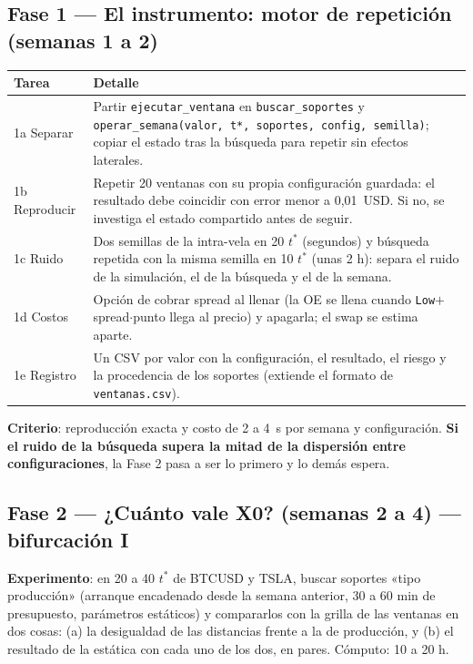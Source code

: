 \documentclass[11pt,a4paper]{article}
\newcommand{\code}[1]{\texttt{\small #1}}
\begin{document}
\subsection{Fase 1 — El instrumento: motor de repetición (semanas 1 a 2)}
\begin{table}[H]
\centering\small
\begin{tabularx}{\linewidth}{lX}
\toprule
Tarea & Detalle \\
\midrule
1a Separar & Partir \code{ejecutar\_ventana} en \code{buscar\_soportes} y \code{operar\_semana(valor, t*, soportes, config, semilla)}; copiar el estado tras la búsqueda para repetir sin efectos laterales. \\
1b Reproducir & Repetir 20 ventanas con su propia configuración guardada: el resultado debe coincidir con error menor a 0,01~USD. Si no, se investiga el estado compartido antes de seguir. \\
1c Ruido & Dos semillas de la intra-vela en 20 $t^*$ (segundos) y búsqueda repetida con la misma semilla en 10 $t^*$ (unas 2 h): separa el ruido de la simulación, el de la búsqueda y el de la semana. \\
1d Costos & Opción de cobrar spread al llenar (la OE se llena cuando \code{Low}$+$spread$\cdot$punto llega al precio) y apagarla; el swap se estima aparte. \\
1e Registro & Un CSV por valor con la configuración, el resultado, el riesgo y la procedencia de los soportes (extiende el formato de \code{ventanas.csv}). \\
\bottomrule
\end{tabularx}
\end{table}
\textbf{Criterio}: reproducción exacta y costo de 2 a 4~s por semana y configuración. \textbf{Si el ruido de la búsqueda supera la
mitad de la dispersión entre configuraciones}, la Fase 2 pasa a ser lo primero y lo demás espera.

\subsection{Fase 2 — ¿Cuánto vale X0? (semanas 2 a 4) — bifurcación I}
\textbf{Experimento}: en 20 a 40 $t^*$ de BTCUSD y TSLA, buscar soportes «tipo producción» (arranque encadenado
desde la semana anterior, 30 a 60 min de presupuesto, parámetros estáticos) y compararlos con la grilla de las
ventanas en dos cosas: (a) la desigualdad de las distancias frente a la de producción, y (b) el resultado de la
estática con cada uno de los dos, en pares. Cómputo: 10 a 20 h.
\end{document}
